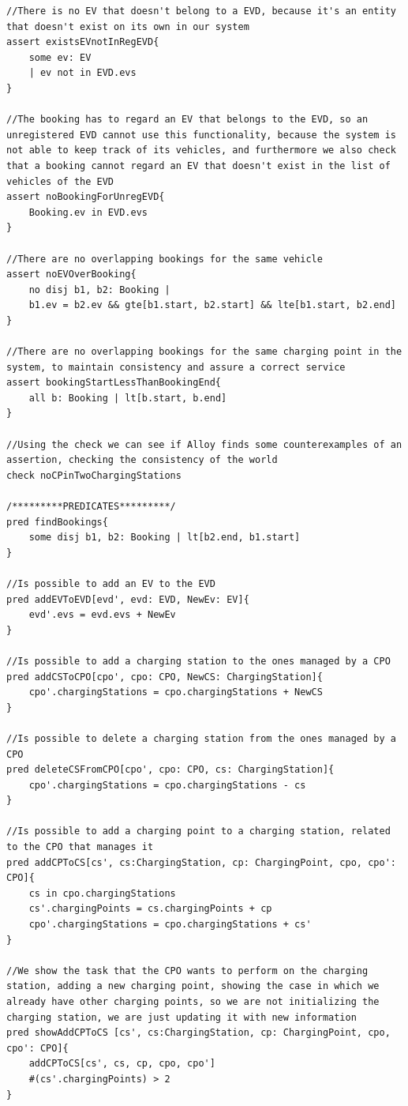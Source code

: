 \begin{lstlisting}[frame = single]
//There is no EV that doesn't belong to a EVD, because it's an entity that doesn't exist on its own in our system
assert existsEVnotInRegEVD{
	some ev: EV
	| ev not in EVD.evs
}

//The booking has to regard an EV that belongs to the EVD, so an unregistered EVD cannot use this functionality, because the system is not able to keep track of its vehicles, and furthermore we also check that a booking cannot regard an EV that doesn't exist in the list of vehicles of the EVD
assert noBookingForUnregEVD{
	Booking.ev in EVD.evs
}

//There are no overlapping bookings for the same vehicle
assert noEVOverBooking{
	no disj b1, b2: Booking |
	b1.ev = b2.ev && gte[b1.start, b2.start] && lte[b1.start, b2.end]
}

//There are no overlapping bookings for the same charging point in the system, to maintain consistency and assure a correct service
assert bookingStartLessThanBookingEnd{
	all b: Booking | lt[b.start, b.end]
}

//Using the check we can see if Alloy finds some counterexamples of an assertion, checking the consistency of the world
check noCPinTwoChargingStations

/*********PREDICATES*********/
pred findBookings{
	some disj b1, b2: Booking | lt[b2.end, b1.start]
}

//Is possible to add an EV to the EVD
pred addEVToEVD[evd', evd: EVD, NewEv: EV]{
	evd'.evs = evd.evs + NewEv
}

//Is possible to add a charging station to the ones managed by a CPO
pred addCSToCPO[cpo', cpo: CPO, NewCS: ChargingStation]{
    cpo'.chargingStations = cpo.chargingStations + NewCS
}

//Is possible to delete a charging station from the ones managed by a CPO
pred deleteCSFromCPO[cpo', cpo: CPO, cs: ChargingStation]{
    cpo'.chargingStations = cpo.chargingStations - cs
}

//Is possible to add a charging point to a charging station, related to the CPO that manages it
pred addCPToCS[cs', cs:ChargingStation, cp: ChargingPoint, cpo, cpo': CPO]{
	cs in cpo.chargingStations
    cs'.chargingPoints = cs.chargingPoints + cp
	cpo'.chargingStations = cpo.chargingStations + cs'
}

//We show the task that the CPO wants to perform on the charging station, adding a new charging point, showing the case in which we already have other charging points, so we are not initializing the charging station, we are just updating it with new information
pred showAddCPToCS [cs', cs:ChargingStation, cp: ChargingPoint, cpo, cpo': CPO]{
	addCPToCS[cs', cs, cp, cpo, cpo']
	#(cs'.chargingPoints) > 2
}


\end{lstlisting}
